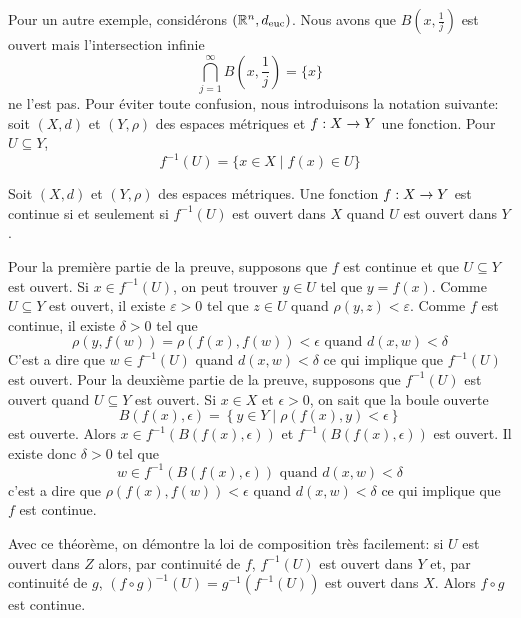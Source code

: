 \documentclass[french]{article}
\begin{document}
\newline Pour un autre exemple, considérons $(\mathbb{R}^n, d_\text{euc})$. Nous avons que $B\left(x, \frac{1}{j}\right)$ est ouvert mais l'intersection infinie
$$\bigcap_{j=1}^{\infty} B\left(x, \frac{1}{j}\right) = \{x\}$$
ne l'est pas.
\newline Pour éviter toute confusion, nous introduisons la notation suivante: soit $(X, d)$ et $(Y, \rho)$ des espaces métriques et $f: X \rightarrow Y$ une fonction. Pour $U \subseteq Y$,
$$f^{-1}(U) = \{ x \in X \mid f(x) \in U \}$$
\begin{theoreme}
  Soit $(X, d)$ et $(Y, \rho)$ des espaces métriques. Une fonction $f: X \rightarrow Y$ est continue si et seulement si $f^{-1}(U)$ est ouvert dans $X$ quand $U$ est ouvert dans $Y$.

  \tcblower
  \begin{preuve}
    Pour la première partie de la preuve, supposons que $f$ est continue et que $U \subseteq Y$ est ouvert. Si $x \in f^{-1}(U)$, on peut trouver $y \in U$ tel que $y=f(x)$.
    \newline Comme  $U \subseteq Y$ est ouvert, il existe $\varepsilon > 0$ tel que $z \in U$ quand $\rho(y, z) < \varepsilon$.
    \newline Comme $f$ est continue, il existe $\delta > 0$ tel que
    $$\rho(y, f(w)) = \rho(f(x), f(w)) < \epsilon \text{ quand } d(x, w) < \delta$$
    C'est a dire que $w \in f^{-1}(U)$ quand $d(x, w) < \delta$ ce qui implique que $f^{-1}(U)$ est ouvert.
    \newline Pour la deuxième partie de la preuve, supposons que $f^{-1}(U)$ est ouvert quand $U\subseteq Y$ est ouvert. Si $x \in X$ et $\epsilon > 0$, on sait que la boule ouverte
    $$B\left(f(x), \epsilon\right) = \left\{ y \in Y \mid \rho(f(x), y) < \epsilon \right\}$$
    est ouverte. Alors $x \in f^{-1}\left(B(f(x), \epsilon)\right)$ et $f^{-1}\left(B(f(x), \epsilon)\right)$ est ouvert.
    \newline Il existe donc $\delta > 0$ tel que 
    $$w \in f^{-1}\left(B(f(x), \epsilon)\right) \text{ quand } d(x, w) < \delta$$
    c'est a dire que $\rho(f(x), f(w)) < \epsilon$ quand $d(x, w) < \delta$ ce qui implique que $f$ est continue.
  \end{preuve}
\end{theoreme}
Avec ce théorème, on démontre la loi de composition très facilement: si $U$ est ouvert dans $Z$ alors, par continuité de $f$, $f^{-1}(U)$ est ouvert dans $Y$ et, par continuité de $g$, $(f \circ g)^{-1}(U) = g^{-1}\left(f^{-1}(U)\right)$ est ouvert dans $X$. Alors $f \circ g$ est continue.
\end{document}

